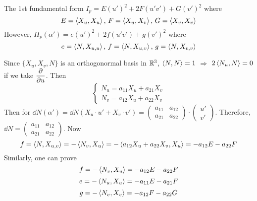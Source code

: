 The 1st fundamental form $ I_p=E(u')^2+2F(u'v')+G(v')^2 $ where 
\begin{equation}
    E=\left<X_u,X_u\right>,\,F=\left<X_u,X_v\right>,\,G=\left<X_v,X_v\right>
\end{equation} 
However,
$ \Pi_p(\alpha')=e(u')^2+2f(u'v')+g(v')^2 $ where
\begin{equation}
    e=\left<N,X_{u,u}\right>,\, f=\left<N,X_{u,v}\right>,\, g=\left<N,X_{v,v}\right>
\end{equation} 

Since  $ \{X_u,X_v, N\} $ is an orthogonormal basis in  $ \mathbb R^3 $,  $ \left<N,N\right>=1 $  $ \Rightarrow  $  $ 2\left<N_u,N\right>=0 $ if we take  $ \displaystyle\frac{\partial }{\partial u} $. Then 
\[\begin{cases}
    N_u=a_{11}X_u+a_{21}X_v\\
    N_v=a_{12}X_u+a_{22}X_v
\end{cases}\]  
Then for  $ \dd N(\alpha')=\dd N(X_u\cdot u'+X_v\cdot v')=\begin{pmatrix}
    a_{11}&a_{12}\\
    a_{21}&a_{22}
\end{pmatrix}\cdot\begin{pmatrix}
    u'\\
    v'
\end{pmatrix}$. Therefore,  $ \dd N=\begin{pmatrix}
    a_{11}&a_{12}\\
    a_{21}&a_{22}
\end{pmatrix} $. Now 
\[f=\left<N,X_{u,v}\right>=-\left<N_v,X_u\right>=-\left<a_{12}X_u+a_{22}X_v,X_u\right>=-a_{12}E-a_{22}F\]
Similarly, one can prove 
\[f=-\left<N_v,X_u\right>=-a_{12}E-a_{22}F\]
\[e=-\left<N_u,X_u\right>=-a_{11}E-a_{21}F\]
\[g=-\left<N_v,X_v\right>=-a_{12}F-a_{22}G\]


